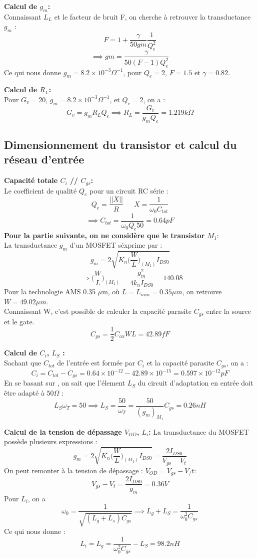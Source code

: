 \documentclass[a4paper]{article}
\begin{document}
\textbf{Calcul de $g_m$:}\\
Connaissant $L_L$ et le facteur de bruit F, on cherche \`a retrouver la transductance $g_m$ :
\[
  F = 1 + \frac{\gamma}{50 gm} \frac{1}{Q^2_e}
\]
\[
  \implies gm = \frac{\gamma}{50 (F-1) Q^2_e}
\]
Ce qui nous donne $g_m = 8.2 \times 10^{-3} \Omega^{-1}$, pour $Q_e = 2$, $F = 1.5$ et $\gamma = 0.82$.

\textbf{Calcul de $R_L$:}\\
Pour $G_v = 20$, $g_m = 8.2 \times 10^{-3} \Omega^{-1}$, et $Q_e = 2$, on a :
  \[
    G_v = g_m R_L Q_e \implies R_L = \frac{G_v}{g_m Q_e} = 1.219 k\Omega
  \]

\subsection{Dimensionnement du transistor et calcul du r\'eseau d'entr\'ee}
\textbf{Capacit\'e totale $C_i$ // $C_{gs}$:}\\
Le coefficient de qualit\'e $Q_e$ pour un circuit RC s\'erie :
\[
  Q_e = \frac{||X||}{R} \phantom{4}\phantom{4}\phantom{4} X = \frac{1}{\omega_0 C_{tot}}
\]
\[
\implies C_{tot} = \frac{1}{\omega_0 Q_e 50} = 0.64 pF
\]
\textbf{Pour la partie suivante, on ne consid\`ere que le transistor $M_1$}:\\
La transductance $g_m$ d'un MOSFET s\'exprime par :
\[
  g_m = 2\sqrt{K_n \bigg( \frac{W}{L} \bigg)_{(M_1)} I_{DS0}}
\]
\[
\implies \bigg(\frac{W}{L}\bigg)_{(M_1)}  = \frac{g^2_m}{4 k_n I_{DS0}} = 140.08
\]
Pour la technologie AMS 0.35 $\mu$m, o\`u $L = L_{min} = 0.35 \mu m$, on retrouve $W = 49.02 \mu m$.\\
Connaissant W, c'est possible de calculer la capacit\'e parasite $C_{gs}$ entre la source et le gate.
\[
C_{gs} = \frac{1}{2} C_{ox} W L = 42.89 fF
\]

\textbf{Calcul de $C_i$, $L_S$ :}\\
Sachant que $C_{tot}$ de l'entr\'ee est form\'ee par $C_i$ et la capacit\'e parasite $C_{gs}$, on a :
\[
  C_i = C_{tot} - C_{gs} = 0.64\times 10^{-12} - 42.89 \times 10^{-15} = 0.597 \times 10^{-12} pF
\]
En se basant sur \cite{RFIC-cours}, on sait que l'\'element $L_S$ du circuit d'adaptation en entr\'ee
doit \^etre adapt\'e \`a $50 \Omega$ :
\[
  L_S \omega_T = 50 \implies L_S = \frac{50}{\omega_T} = \frac{50}{(g_m)_{M_1}}C_{gs} = 0.26 nH
\]

\clearpage
\textbf{Calcul de la tension de d\'epassage $V_{OD}$, $L_i$:}
La transductance du MOSFET poss\`ede plusieurs expressions :
\[
  g_m = 2\sqrt{K_n \bigg( \frac{W}{L} \bigg)_{(M_1)} I_{DS0}} = \frac{2 I_{DS0}}{V_{gs} - V_{t}}
\]
On peut remonter \`a la tension de d\'epassage : $V_{OD} = V_{gs} - V_/{t}$:
\[
  V_{gs} - V_{t} = \frac{2 I_{DS0}}{g_m} = 0.36 V
\]
Pour $L_i$, on a
\[
  \omega_0 = \frac{1}{\sqrt{(L_g + L_s) C_{gs}}} \implies L_g + L_S = \frac{1}{\omega^2_0 C_{gs}}
\]
Ce qui nous donne :
\[
  L_i = L_g = \frac{1}{\omega^2_0 C_{gs}} - L_{S} = 98.2 nH
\]
\end{document}
